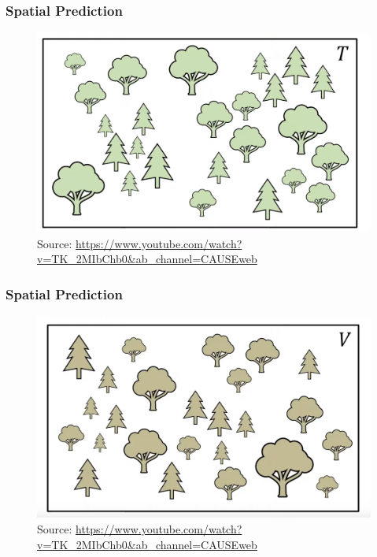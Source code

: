 \documentclass[
  shownotes,
  xcolor={svgnames},
  hyperref={colorlinks,citecolor=DarkBlue,linkcolor=andesred,urlcolor=DarkBlue}
  , aspectratio=169]{beamer}
\begin{document}
\begin{frame}[fragile]
\frametitle{Spatial Prediction}

\begin{figure}[H] \centering
            \captionsetup{justification=centering}
\includegraphics[scale=0.4]{figures/spatial_cross/fig02.png}
\\
\tiny
Source: \url{https://www.youtube.com/watch?v=TK_2MIbChb0&ab_channel=CAUSEweb}
 \end{figure}
\end{frame}

\begin{frame}[fragile]
\frametitle{Spatial Prediction}

\begin{figure}[H] \centering
            \captionsetup{justification=centering}
\includegraphics[scale=0.4]{figures/spatial_cross/fig03.png}
\\
\tiny
Source: \url{https://www.youtube.com/watch?v=TK_2MIbChb0&ab_channel=CAUSEweb}
 \end{figure}
\end{frame}
\end{document}

